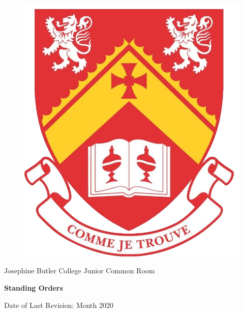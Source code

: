 \begin{titlepage}
    \AddToShipoutPicture*{\BackgroundPic}
    
    \begin{figure}[t]
    \includegraphics[scale=0.8]{Functional/Josephine_Butler_College_Crest.png}
    \centering
    \end{figure}
    
        \vspace*{1.0cm}    
        \begin{center}
            \begin{tcolorbox}[colback=red!5!white,colframe=red!75!black,text width=11cm]
                \begin{center}
                    
                    Josephine Butler College Junior Common Room
                    
                    \vspace{1cm}
                    
                    \textbf{\Huge{\color{myred}Standing Orders}}
                    
                    \vspace{1cm}
                    
                    Date of Last Revision: Month 2020
                    
                    \vfill
                \end{center}
            \end{tcolorbox}
        \end{center}
\end{titlepage}
